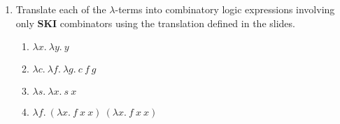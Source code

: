 \documentclass[11pt]{report}
\begin{document}
\begin{enumerate}
\item Translate each of the $\lambda$-terms into combinatory logic expressions involving only \textbf{SKI} combinators using the translation defined in the slides.

	\begin{enumerate}
		\item $\lambda x. \ \lambda y. \ y$
		\item $\lambda c. \ \lambda f. \ \lambda g.  \ c \ f \ g$
		\item $\lambda s . \ \lambda x. \ s \ x$
		\item $\lambda f. \ (\lambda x. \ f \ x \ x) \ (\lambda x. \ f \ x \ x)$ 	
	\end{enumerate}

	

	 
\end{enumerate}
	
\end{document}

